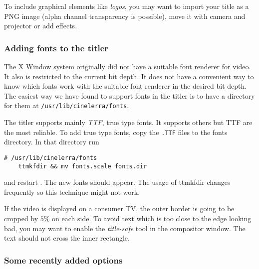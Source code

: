 To include graphical elements like \textit{logos}, you may want to import your title as a PNG image (alpha channel transparency is possible), move it with camera and projector or add effects.

\subsubsection*{Adding fonts to the titler}%
\label{ssub:adding_fonts_to_titler}

The X Window system originally did not have a suitable font renderer for video. It also is restricted to the current bit depth. It does not have a convenient way to know which fonts work with the suitable font renderer in the desired bit depth. The easiest way we have found to support fonts in the titler is to have a directory for them at \texttt{/usr/lib/cinelerra/fonts}.

The titler supports mainly \textit{TTF}, true type fonts. It supports others but TTF are the most reliable. To add true type fonts, copy the \texttt{.TTF} files to the fonts directory. In that directory run
\vspace{1ex}
\begin{lstlisting}[style=sh]
    # /usr/lib/cinelerra/fonts
    ttmkfdir && mv fonts.scale fonts.dir
\end{lstlisting}
and restart \CGG{}. The new fonts should appear. The usage of ttmkfdir changes frequently so this technique might not work.

If the video is displayed on a consumer TV, the outer border is going to be cropped by $5\%$ on each side. To avoid text which is too close to the edge looking bad, you may want to enable the \textit{title-safe} tool in the compositor window. The text should not cross the inner rectangle.

\subsubsection*{Some recently added options}%
\label{ssub:some_recently_added_options}


